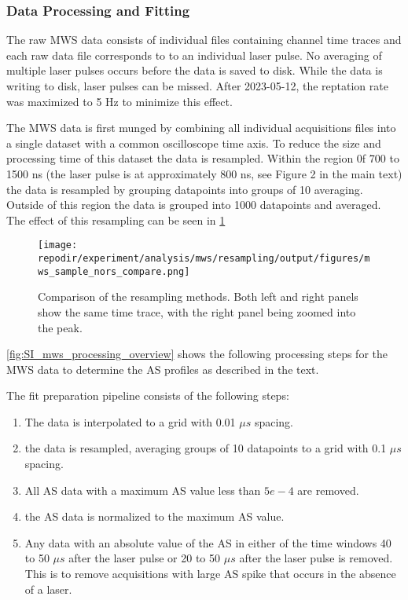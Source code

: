 \subsubsection{Data Processing and Fitting}

The raw MWS data consists of individual files containing channel time traces and each raw data file corresponds to to an individual laser pulse. No averaging of multiple laser pulses occurs before the data is saved to disk. While the data is writing to disk, laser pulses can be missed. After 2023-05-12,  the reptation rate was maximized to 5 Hz to minimize this effect. 

The MWS data is first munged by combining all individual acquisitions files into a single dataset with a common oscilloscope time axis. To reduce the size and processing time of this dataset the data is resampled. Within the region 0f 700 to 1500 ns (the laser pulse is at approximately 800 ns, see Figure 2 in the main text) the data is resampled by grouping datapoints into groups of 10 averaging. Outside of this region the data is grouped into 1000 datapoints and averaged. The effect of this resampling can be seen in \ref{fig:SI_mws_resampling}

\begin{figure}
\centering
\texttt{[image: \\repodir/experiment/analysis/mws/resampling/output/figures/mws\_sample\_nors\_compare.png]}
\caption{Comparison of the resampling methods. Both left and right panels show the same time trace, with the right panel being zoomed into the peak.}
\label{fig:SI_mws_resampling}
\end{figure}

\ref{fig:SI_mws_processing_overview} shows the following processing steps for the MWS data to determine the AS profiles as described in the text.

The fit preparation pipeline consists of the following steps:

\begin{enumerate}
    \item The data is interpolated to a grid with 0.01 $\mu s$ spacing.
    \item the data is resampled, averaging groups of 10 datapoints to a grid with 0.1 $\mu s$ spacing.
    \item  All AS data with a maximum AS value less than $5e-4$ are removed.
    \item the AS data is normalized to the maximum AS value.
    \item Any data with an absolute value of the AS in either of the time windows 40 to 50 $\mu s$ after the laser pulse or 20 to 50 $\mu s$ after the laser pulse is removed. This is to remove acquisitions with large AS spike that occurs in the absence of a laser. 
\end{enumerate}


